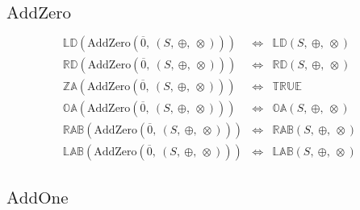 \documentclass[10pt]{article}
\newcommand{\propname}[1]{{\mathbb{#1}}}
\begin{document}

\subsection{$\mathrm{AddZero}$} 

\[
\begin{array}{rcl} 
\propname{LD}(\mathrm{AddZero}(\overline{0},\ (S,\ \oplus,\ \otimes))) 
    & \Leftrightarrow %
    & \propname{LD}(S,\ \oplus,\ \otimes) \\
\propname{RD}(\mathrm{AddZero}(\overline{0},\ (S,\ \oplus,\ \otimes))) 
    & \Leftrightarrow %
    & \propname{RD}(S,\ \oplus,\ \otimes) \\
\propname{ZA}(\mathrm{AddZero}(\overline{0},\ (S,\ \oplus,\ \otimes))) 
    & \Leftrightarrow %
    & \propname{TRUE}\\ 
\propname{OA}(\mathrm{AddZero}(\overline{0},\ (S,\ \oplus,\ \otimes))) 
    & \Leftrightarrow %
    & \propname{OA}(S,\ \oplus,\ \otimes) \\
\propname{RAB}(\mathrm{AddZero}(\overline{0},\ (S,\ \oplus,\ \otimes))) 
    & \Leftrightarrow %
    & \propname{RAB}(S,\ \oplus,\ \otimes)\\ 
\propname{LAB}(\mathrm{AddZero}(\overline{0},\ (S,\ \oplus,\ \otimes))) 
    & \Leftrightarrow %
    & \propname{LAB}(S,\ \oplus,\ \otimes)\\ 
\end{array} 
\] 

\subsection{$\mathrm{AddOne}$} 

\end{document}
